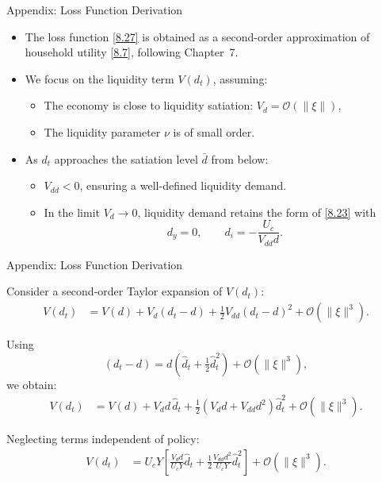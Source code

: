 \documentclass[11pt,aspectratio=169]{beamer}
\begin{document}
\begin{frame}[label=Appendix H.1]{Appendix: Loss Function Derivation}

\begin{itemize}
  \item The loss function \eqref{8.27} is obtained as a second-order approximation of household utility \eqref{8.7}, following Chapter~7.
  \item We focus on the liquidity term $V(d_t)$, assuming:
  \begin{itemize}
    \item The economy is close to liquidity satiation: $V_d = \mathcal{O}(\|\xi\|)$,
    \item The liquidity parameter $\nu$ is of small order.
  \end{itemize}
  \item As $d_t$ approaches the satiation level $\bar d$ from below:
  \begin{itemize}
    \item $V_{dd}<0$, ensuring a well-defined liquidity demand.
    \item In the limit $V_d \to 0$, liquidity demand retains the form of \eqref{8.23} with
    \[
      d_y = 0,
      \qquad
      d_i = -\frac{U_c}{V_{dd}d}.
    \]
  \end{itemize}
\end{itemize}

\end{frame}


\begin{frame}{Appendix: Loss Function Derivation}

Consider a second-order Taylor expansion of $V(d_t)$:
\begin{align*}
V(d_t)
&= V(d)
  + V_d(d_t-d)
  + \tfrac12 V_{dd}(d_t-d)^2
  + \mathcal{O}(\|\xi\|^3).
\end{align*}

Using
\[
(d_t-d)=d\!\left(\hat d_t + \tfrac12 \hat d_t^2\right)
  + \mathcal{O}(\|\xi\|^3),
\]
we obtain:
\begin{align*}
V(d_t)
&= V(d)
 + V_d d\,\hat d_t
 + \tfrac12 (V_d d + V_{dd} d^2)\hat d_t^2
 + \mathcal{O}(\|\xi\|^3).
\end{align*}

Neglecting terms independent of policy:
\begin{align*}
V(d_t)
&= U_c Y
\left[
\frac{V_d d}{U_c Y}\hat d_t
+ \tfrac12\frac{V_{dd} d^2}{U_c Y}\hat d_t^2
\right]
+ \mathcal{O}(\|\xi\|^3).
\end{align*}

\end{frame}
\end{document}
